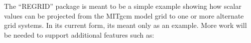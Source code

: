 
The ``REGRID'' package is meant to be a simple example showing how
scalar values can be projected from the MITgcm model grid to one or
more alternate grid systems.  In its current form, its meant only as
an example.  More work will be needed to support additional features
such as:

